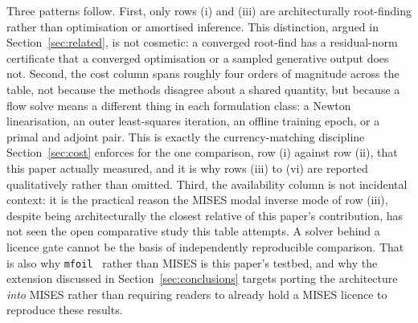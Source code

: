 Three patterns follow. First, only rows (i) and (iii) are architecturally
root-finding rather than optimisation or amortised inference. This
distinction, argued in Section~\ref{sec:related}, is not cosmetic: a converged
root-find has a residual-norm certificate that a converged optimisation or a
sampled generative output does not. Second, the cost column spans roughly four
orders of magnitude across the table, not because the methods disagree about a
shared quantity, but because a flow solve means a different thing in each
formulation class: a Newton linearisation, an outer least-squares iteration,
an offline training epoch, or a primal and adjoint pair. This is exactly the
currency-matching discipline Section~\ref{sec:cost} enforces for the one
comparison, row (i) against row (ii), that this paper actually measured, and
it is why rows (iii) to (vi) are reported qualitatively rather than omitted.
Third, the availability column is not incidental context: it is the practical
reason the MISES modal inverse mode of row (iii), despite being
architecturally the closest relative of this paper's contribution, has not
seen the open comparative study this table attempts. A solver behind a
licence gate cannot be the basis of independently reproducible comparison.
That is also why \texttt{mfoil}~\citep{fidkowski2022coupled} rather than MISES
is this paper's testbed, and why the extension discussed in
Section~\ref{sec:conclusions} targets porting the architecture \emph{into}
MISES rather than requiring readers to already hold a MISES licence to
reproduce these results.
